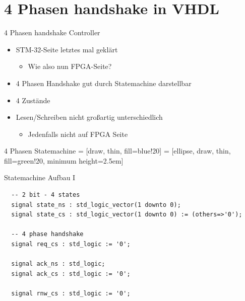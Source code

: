  \section{4 Phasen handshake in VHDL}
  \begin{frame} {4 Phasen handshake Controller}
    \begin{itemize}
      \item STM-32-Seite letztes mal geklärt
      \begin{itemize}
        \item Wie also nun FPGA-Seite?
      \end{itemize}
      \item 4 Phasen Handshake gut durch Statemachine darstellbar
      \item 4 Zustände
      \item Lesen/Schreiben nicht großartig unterschiedlich
      \begin{itemize}
        \item Jedenfalls nicht auf FPGA Seite
      \end{itemize}
    \end{itemize}
  \end{frame}


  \begin{frame} {4 Phasen Statemachine}
     = [draw, thin, fill=blue!20]
     = [ellipse, draw, thin, fill=green!20, minimum height=2.5em]
    
    \begin{center}
      \begin{figure}
      \end{figure}
    \end{center}
  \end{frame}




  \begin{frame} [fragile] {Statemachine Aufbau I}
    \begin{lstlisting}
  -- 2 bit - 4 states
  signal state_ns : std_logic_vector(1 downto 0);
  signal state_cs : std_logic_vector(1 downto 0) := (others=>'0');

  -- 4 phase handshake 
  signal req_cs : std_logic := '0';

  signal ack_ns : std_logic;
  signal ack_cs : std_logic := '0';

  signal rnw_cs : std_logic := '0';
    \end{lstlisting}
  \end{frame}


